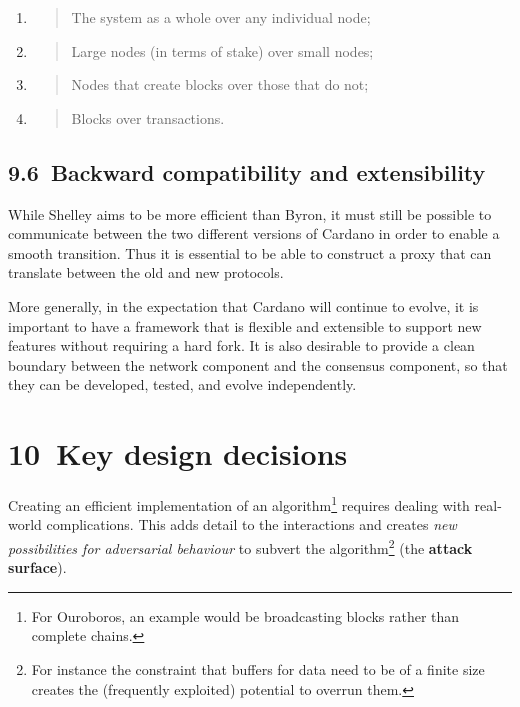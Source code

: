 \documentclass[]{article}
\begin{document}
\begin{enumerate}
\def\labelenumi{\arabic{enumi}.}
\item
  \begin{quote}
  The system as a whole over any individual node;
  \end{quote}
\item
  \begin{quote}
  Large nodes (in terms of stake) over small nodes;
  \end{quote}
\item
  \begin{quote}
  Nodes that create blocks over those that do not;
  \end{quote}
\item
  \begin{quote}
  Blocks over transactions.
  \end{quote}
\end{enumerate}

\hypertarget{backward-compatibility-and-extensibility}{%
\subsection{​9.6​~Backward compatibility and
extensibility}\label{backward-compatibility-and-extensibility}}

While Shelley aims to be more efficient than Byron, it must still be
possible to communicate between the two different versions of Cardano in
order to enable a smooth transition. Thus it is essential to be able to
construct a proxy that can translate between the old and new protocols.

More generally, in the expectation that Cardano will continue to evolve,
it is important to have a framework that is flexible and extensible to
support new features without requiring a hard fork. It is also desirable
to provide a clean boundary between the network component and the
consensus component, so that they can be developed, tested, and evolve
independently.

\hypertarget{key-design-decisions}{%
\section{​10​~Key design decisions}\label{key-design-decisions}}

Creating an efficient implementation of an algorithm\footnote{For
  Ouroboros, an example would be broadcasting blocks rather than
  complete chains.} requires dealing with real-world complications. This
adds detail to the interactions and creates \emph{new possibilities for
adversarial behaviour} to subvert the algorithm\footnote{For instance
  the constraint that buffers for data need to be of a finite size
  creates the (frequently exploited) potential to overrun them.} (the
\textbf{attack surface}).
\end{document}
